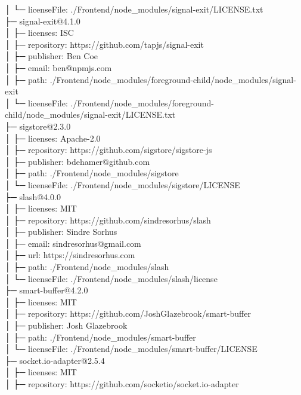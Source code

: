 │  └─ licenseFile: ./Frontend/node\_modules/signal-exit/LICENSE.txt\\
├─ signal-exit@4.1.0\\
│  ├─ licenses: ISC\\
│  ├─ repository: https://github.com/tapjs/signal-exit\\
│  ├─ publisher: Ben Coe\\
│  ├─ email: ben@npmjs.com\\
│  ├─ path: ./Frontend/node\_modules/foreground-child/node\_modules/signal-exit\\
│  └─ licenseFile: ./Frontend/node\_modules/foreground-child/node\_modules/signal-exit/LICENSE.txt\\
├─ sigstore@2.3.0\\
│  ├─ licenses: Apache-2.0\\
│  ├─ repository: https://github.com/sigstore/sigstore-js\\
│  ├─ publisher: bdehamer@github.com\\
│  ├─ path: ./Frontend/node\_modules/sigstore\\
│  └─ licenseFile: ./Frontend/node\_modules/sigstore/LICENSE\\
├─ slash@4.0.0\\
│  ├─ licenses: MIT\\
│  ├─ repository: https://github.com/sindresorhus/slash\\
│  ├─ publisher: Sindre Sorhus\\
│  ├─ email: sindresorhus@gmail.com\\
│  ├─ url: https://sindresorhus.com\\
│  ├─ path: ./Frontend/node\_modules/slash\\
│  └─ licenseFile: ./Frontend/node\_modules/slash/license\\
├─ smart-buffer@4.2.0\\
│  ├─ licenses: MIT\\
│  ├─ repository: https://github.com/JoshGlazebrook/smart-buffer\\
│  ├─ publisher: Josh Glazebrook\\
│  ├─ path: ./Frontend/node\_modules/smart-buffer\\
│  └─ licenseFile: ./Frontend/node\_modules/smart-buffer/LICENSE\\
├─ socket.io-adapter@2.5.4\\
│  ├─ licenses: MIT\\
│  ├─ repository: https://github.com/socketio/socket.io-adapter\\
